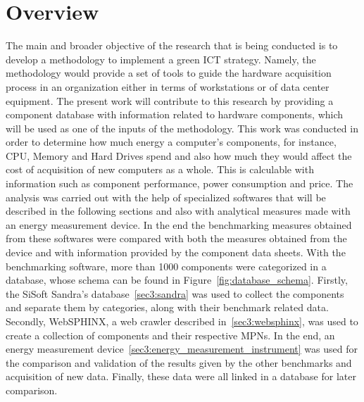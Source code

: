 \section{Overview} \label{sec3:overview}
    The main and broader objective of the research that is being conducted is to develop a methodology to implement a green ICT strategy. Namely, the methodology would provide a set of tools to guide the hardware acquisition process in an organization either in terms of workstations or of data center equipment. The present work will contribute to this research by providing a component database with information related to hardware components, which will be used as one of the inputs of the methodology. This work was conducted in order to determine how much energy a computer's components, for instance, CPU, Memory and Hard Drives spend and also how much they would affect the cost of acquisition of new computers as a whole. This is calculable with information such as component performance, power consumption and price. The analysis was carried out with the help of specialized softwares that will be described in the following sections and also with analytical measures made with an energy measurement device. In the end the benchmarking measures obtained from these softwares were compared with both the measures obtained from the device and with information provided by the component data sheets. With the benchmarking software, more than 1000 components were categorized in a database, whose schema can be found in Figure~\ref{fig:database_schema}. Firstly, the SiSoft Sandra's database~\ref{sec3:sandra} was used to collect the components and separate them by categories, along with their benchmark related data. Secondly, WebSPHINX, a web crawler described in~\ref{sec3:websphinx}, was used to create a collection of components and their respective MPNs. In the end, an energy measurement device~\ref{sec3:energy_measurement_instrument} was used for the comparison and validation of the results given by the other benchmarks and acquisition of new data. 
    Finally, these data were all linked in a database for later comparison. 

